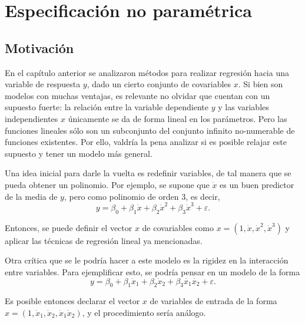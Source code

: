 \chapter[Especificaci\'on no param\'etrica]{Especificaci\'on no param\'etrica}

\section{Motivaci\'on}

En el cap\'itulo anterior se analizaron m\'etodos para realizar regresi\'on hacia una variable de respuesta $y$, dado un cierto conjunto de covariables $x$. Si bien son modelos con muchas ventajas, es relevante no olvidar que cuentan con un supuesto fuerte: la relación entre la variable dependiente $y$ y las variables independientes $x$ \'unicamente se da de forma lineal en los par\'ametros. Pero las funciones lineales s\'olo son un subconjunto del conjunto infinito no-numerable de funciones existentes. Por ello, valdr\'ia la pena analizar si es posible relajar este supuesto y tener un modelo m\'as general.

Una idea inicial para darle la vuelta es redefinir variables, de tal manera que se pueda obtener un polinomio. Por ejemplo, se supone que $\dot{x}$ es un buen predictor de la media de $y$, pero como polinomio de orden 3, es decir,
\begin{equation*}
    y = \beta_0 + \beta_1\dot{x} + \beta_2\dot{x}^2 + \beta_3\dot{x}^3 + \varepsilon.
\end{equation*}

Entonces, se puede definir el vector $x$ de covariables como $x = (1,\dot{x},\dot{x}^2,\dot{x}^3)$ y aplicar las t\'ecnicas de regresi\'on lineal ya mencionadas.

Otra cr\'itica que se le podr\'ia hacer a este modelo es la rigidez en la interacci\'on entre variables. Para ejemplificar esto, se podr\'ia pensar en un modelo de la forma
\begin{equation*}
    y = \beta_0 + \beta_1\dot{x}_1 + \beta_2\dot{x}_2 + \beta_3\dot{x_1}\dot{x_2} + \varepsilon.
\end{equation*}

Es posible entonces declarar el vector $x$ de variables de entrada de la forma $x = (1,\dot{x}_1,\dot{x}_2,\dot{x}_1\dot{x}_2)$, y el procedimiento ser\'ia an\'alogo.


